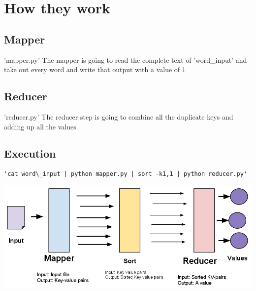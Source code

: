 \documentclass{article}
\begin{document}
\section{How they work}
\subsection{Mapper}
'mapper.py'
The mapper is going to read the complete text of 'word\_input' and take out every word and write that output with a value of 1
\subsection{Reducer}
'reducer.py'
The reducer step is going to combine all the duplicate keys and adding up all the values
\subsection{Execution}
\begin{lstlisting}
'cat word\_input | python mapper.py | sort -k1,1 | python reducer.py'
\end{lstlisting}
\includegraphics[width=\textwidth,height=\textheight,keepaspectratio]{fig/mapreduce_diag.png}
\end{document}
